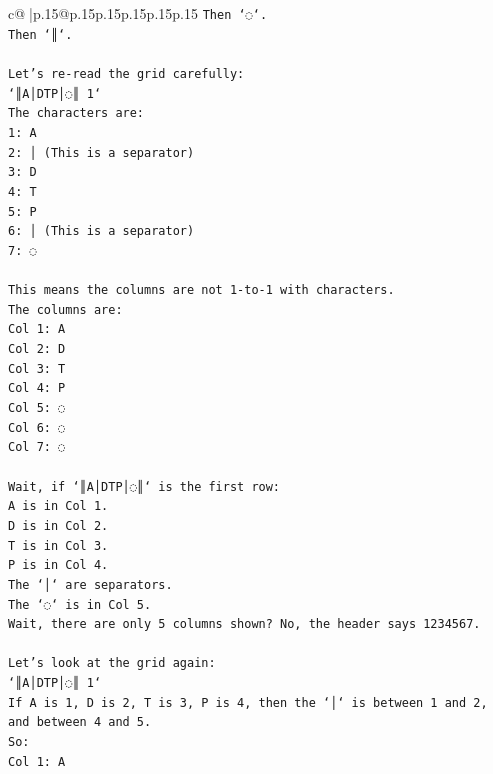 \documentclass{article}
\begin{document}
{\begin{supertabular}{c@{$\;$}|p{.15\linewidth}@{}p{.15\linewidth}p{.15\linewidth}p{.15\linewidth}p{.15\linewidth}p{.15\linewidth}}
{{{\texttt{Then `◌`.} \\
\texttt{Then `║`.} \\
\\ 
\texttt{Let's re{-}read the grid carefully:} \\
\texttt{`║A│DTP│◌║ 1`} \\
\texttt{The characters are:} \\
\texttt{1: A} \\
\texttt{2: │ (This is a separator)} \\
\texttt{3: D} \\
\texttt{4: T} \\
\texttt{5: P} \\
\texttt{6: │ (This is a separator)} \\
\texttt{7: ◌} \\
\\ 
\texttt{This means the columns are not 1{-}to{-}1 with characters.} \\
\texttt{The columns are:} \\
\texttt{Col 1: A} \\
\texttt{Col 2: D} \\
\texttt{Col 3: T} \\
\texttt{Col 4: P} \\
\texttt{Col 5: ◌} \\
\texttt{Col 6: ◌} \\
\texttt{Col 7: ◌} \\
\\ 
\texttt{Wait, if `║A│DTP│◌║` is the first row:} \\
\texttt{A is in Col 1.} \\
\texttt{D is in Col 2.} \\
\texttt{T is in Col 3.} \\
\texttt{P is in Col 4.} \\
\texttt{The `│` are separators.} \\
\texttt{The `◌` is in Col 5.} \\
\texttt{Wait, there are only 5 columns shown? No, the header says 1234567.} \\
\\ 
\texttt{Let's look at the grid again:} \\
\texttt{`║A│DTP│◌║ 1`} \\
\texttt{If A is 1, D is 2, T is 3, P is 4, then the `│` is between 1 and 2, and between 4 and 5.} \\
\texttt{So:} \\
\texttt{Col 1: A} \\
}}}
\end{supertabular}}
\end{document}
